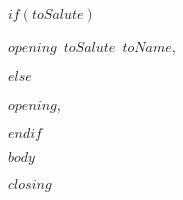 \documentclass[DIN,
    fontsize=11pt,           %
    paper=a4,                %
    firsthead=on,            %
    firstfoot=on,            %
    pagenumber=off,          %
    parskip=half,            %
    enlargefirstpage=on,     %
    fromalign=locationright, %
    fromrule=afteraddress,
    addrfield=on,            %
    subject=beforeopening,   %
    foldmarks=on,            %
    numericaldate=on,        %
]{scrlttr2}
\newcommand{\toSalute}{$toSalute$}
\newcommand{\toName}{$toName$}
\newcommand{\myClosing}{$closing$}
\newcommand{\myOpening}{$opening$}
\begin{document}
\begin{letter}{}
 
  $if(toSalute)$
    \opening{\myOpening\ \toSalute\ \toName,}
  $else$
    \opening{\myOpening,}
  $endif$
  
  $body$

  \closing{\myClosing}

\end{letter}
\end{document}
